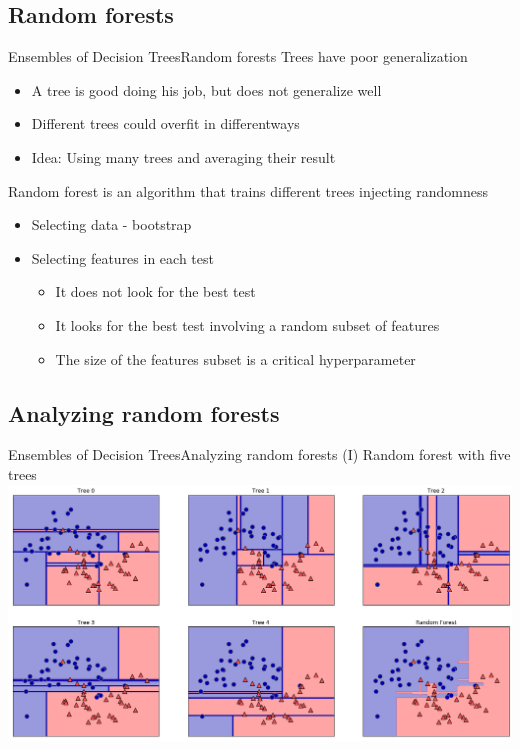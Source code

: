 \documentclass[10pt,compress]{beamer} %
\begin{document}
\subsection{Random forests}
\begin{frame}{Ensembles of Decision Trees}{Random forests}
    Trees have poor generalization
    \begin{itemize}
        \item A tree is good doing his job, but does not generalize well
        \item Different trees could overfit in differentways
        \item Idea: Using many trees and averaging their result
    \end{itemize}

    \alert{Random forest} is an algorithm that trains different trees injecting randomness
    \begin{itemize}
        \item Selecting data - bootstrap
        \item Selecting features in each test
            \begin{itemize}
                \item It does not look for the best test
                \item It looks for the best test involving a random subset of features
                \item The size of the features subset is a critical hyperparameter
            \end{itemize}
    \end{itemize}
\end{frame}

\subsection{Analyzing random forests}
\begin{frame}{Ensembles of Decision Trees}{Analyzing random forests (I)}
    Random forest with five trees\\
    \bigskip
    \centering \includegraphics[width=0.8\linewidth]{figs/forest.png}
\end{frame}
\end{document}
